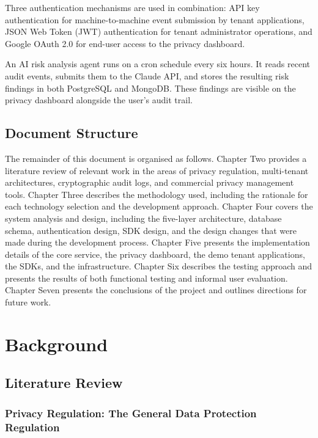 \documentclass[a4paper,12pt,onecolumn]{report}
\begin{document}
Three authentication mechanisms are used in combination: API key authentication for machine-to-machine event submission by tenant applications, JSON Web Token (JWT) authentication \cite{rfc7519} for tenant administrator operations, and Google OAuth 2.0 \cite{rfc6749} for end-user access to the privacy dashboard.

An AI risk analysis agent runs on a cron schedule every six hours.
It reads recent audit events, submits them to the Claude API, and stores the resulting risk findings in both PostgreSQL and MongoDB.
These findings are visible on the privacy dashboard alongside the user's audit trail.

\section{Document Structure}

The remainder of this document is organised as follows.
Chapter Two provides a literature review of relevant work in the areas of privacy regulation, multi-tenant architectures, cryptographic audit logs, and commercial privacy management tools.
Chapter Three describes the methodology used, including the rationale for each technology selection and the development approach.
Chapter Four covers the system analysis and design, including the five-layer architecture, database schema, authentication design, SDK design, and the design changes that were made during the development process.
Chapter Five presents the implementation details of the core service, the privacy dashboard, the demo tenant applications, the SDKs, and the infrastructure.
Chapter Six describes the testing approach and presents the results of both functional testing and informal user evaluation.
Chapter Seven presents the conclusions of the project and outlines directions for future work.


\chapter{Background}

\section{Literature Review}

\subsection{Privacy Regulation: The General Data Protection Regulation}
\end{document}
